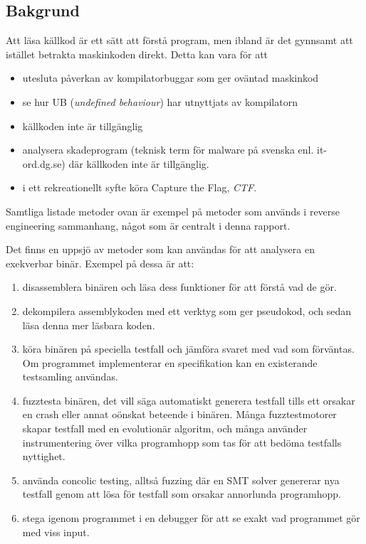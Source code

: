 \subsection{Bakgrund}

Att läsa källkod är ett sätt att förstå program, men ibland är det gynnsamt att istället betrakta
maskinkoden direkt. Detta kan vara för att
\begin{itemize}
  \item utesluta påverkan av kompilatorbuggar som ger oväntad maskinkod
  \item se hur UB (\emph{undefined behaviour}) har utnyttjats av kompilatorn
  \item källkoden inte är tillgänglig
  \item analysera skadeprogram (teknisk term för malware på svenska enl.
    it-ord.dg.se) där källkoden inte är tillgänglig.
  \item i ett rekreationellt syfte köra Capture the Flag, \textit{CTF}.
\end{itemize}
Samtliga listade metoder ovan är exempel på metoder som används i reverse
engineering sammanhang, något som är centralt i denna rapport.

Det finns en uppsjö av metoder som kan användas för att analysera en exekverbar
binär. Exempel på dessa är att:
\begin{enumerate}
  \item disassemblera binären och läsa dess funktioner för att förstå vad de gör.
  \item dekompilera assemblykoden med ett verktyg som ger pseudokod, och sedan läsa denna mer
    läsbara koden.
  \item köra binären på speciella testfall och jämföra svaret med vad som förväntas. Om
    programmet implementerar en specifikation kan en existerande testsamling användas.
  \item fuzztesta binären, det vill säga automatiskt generera testfall tills ett orsakar en crash eller
    annat oönskat beteende i binären. Många fuzztestmotorer skapar testfall med en evolutionär
    algoritm, och många använder instrumentering över vilka programhopp som tas för att bedöma
    testfalls nyttighet.
  \item använda concolic testing, alltså fuzzing där en SMT solver genererar nya testfall genom att
    lösa för testfall som orsakar annorlunda programhopp.
  \item stega igenom programmet i en debugger för att se exakt vad programmet gör med viss input.
\end{enumerate}

